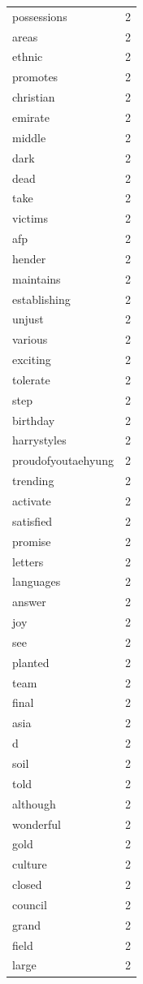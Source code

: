 \begin{tabular}{lr}
possessions & 2 \\
areas & 2 \\
ethnic & 2 \\
promotes & 2 \\
christian & 2 \\
emirate & 2 \\
middle & 2 \\
dark & 2 \\
dead & 2 \\
take & 2 \\
victims & 2 \\
afp & 2 \\
hender & 2 \\
maintains & 2 \\
establishing & 2 \\
unjust & 2 \\
various & 2 \\
exciting & 2 \\
tolerate & 2 \\
step & 2 \\
birthday & 2 \\
harrystyles & 2 \\
proudofyoutaehyung & 2 \\
trending & 2 \\
activate & 2 \\
satisfied & 2 \\
promise & 2 \\
letters & 2 \\
languages & 2 \\
answer & 2 \\
joy & 2 \\
see & 2 \\
planted & 2 \\
team & 2 \\
final & 2 \\
asia & 2 \\
d & 2 \\
soil & 2 \\
told & 2 \\
although & 2 \\
wonderful & 2 \\
gold & 2 \\
culture & 2 \\
closed & 2 \\
council & 2 \\
grand & 2 \\
field & 2 \\
large & 2 \\

\end{tabular}
